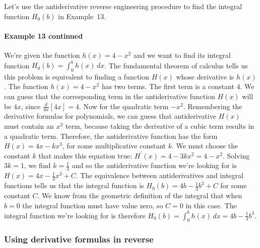 			Let's use the antiderivative reverse engineering procedure
			to find the integral function $H_0(b)$ in Example~13.
			

			\paragraph{Example 13 continued}

				We're given the function $h(x) = 4 - x^2$
				and we want to find its integral function $H_0(b) = \int_0^b  h(x)\, dx$.
				The fundamental theorem of calculus tells us this problem
				is equivalent to finding a function $H(x)$ whose derivative is $h(x)$.
				The function $h(x) = 4 - x^2$ has two terms.
				The first term is a constant $4$.
				We can guess that the corresponding term in the antiderivative function $H(x)$
				will be $4x$,
				since $\frac{d}{dx}[ 4x ] = 4$.
				Now for the quadratic term $-x^2$.
				Remembering the derivative formulas for polynomials,
				we can guess that antiderivative $H(x)$ must contain an $x^3$ term,
				because taking the derivative of a cubic term results in a quadratic term.
				Therefore,
				the antiderivative function has the form $H(x) = 4x - kx^3$,
				for some multiplicative constant $k$.
				We must choose the constant $k$ that makes this equation true:
				$H^{\prime\!}(x) = 4 - 3kx^2 = 4 - x^2$.
				Solving $3k=1$,
				we find $k=\frac{1}{3}$
				and so the antiderivative function
				we're looking for is $H(x) = 4x - \frac{1}{3}x^3 + C$.
				The equivalence between antiderivatives and integral functions
				tells us that the integral function is $H_0(b) =  4b - \frac{1}{3}b^3 + C$
				for some constant $C$.
				We know from the geometric definition of the integral that
				when $b=0$ the integral function must have value zero,
				so $C=0$ in this case.
				The integral function we're looking for is therefore
				$H_0(b) = \int_0^b h(x)\,dx = 4b - \frac{1}{3}b^3$.



		\subsubsection{Using derivative formulas in reverse}

